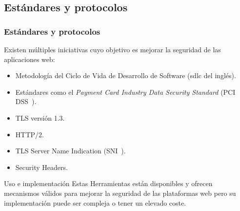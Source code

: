 \subsection{Estándares y protocolos}
\begin{frame}[shrink=20]
  \frametitle{Estándares y protocolos}
  Existen múltiples iniciativas cuyo objetivo es mejorar la seguridad de las aplicaciones web:
  \begin{itemize}
    \item Metodología del Ciclo de Vida de Desarrollo de Software (\acrshort{sdlc} del inglés).
    \item Estándares como el {\em Payment Card Industry Data Security Standard} (PCI DSS~\cite{pcidssrequirements}).
    \item TLS versión 1.3.
    \item HTTP/2.
    \item TLS Server Name Indication (SNI~\cite{wiki:TLSSNI}).
    \item Security Headers.
  \end{itemize}
  \begin{block}{Uso e implementación}
  Estas Herramientas están disponibles y ofrecen mecanismos válidos para mejorar la seguridad de las plataformas web pero su implementación puede ser compleja o tener un elevado coste.
  \end{block}
\end{frame}


